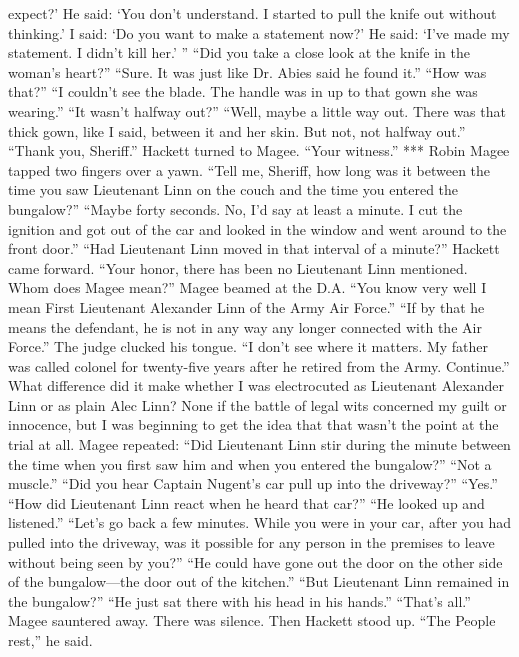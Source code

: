\documentclass{novel}
\begin{document}
expect?’ He said: ‘You don’t understand. I started to pull the knife out without thinking.’ I said: ‘Do you want to make a statement now?’ He said: ‘I’ve made my statement. I didn’t kill her.’ ” “Did you take a close look at the knife in the woman’s heart?” “Sure. It was just like Dr. Abies said he found it.” “How was that?” “I couldn’t see the blade. The handle was in up to that gown she was wearing.” “It wasn’t halfway out?” “Well, maybe a little way out. There was that thick gown, like I said, between it and her skin. But not, not halfway out.” “Thank you, Sheriff.” Hackett turned to Magee. “Your witness.” *** Robin Magee tapped two fingers over a yawn. “Tell me, Sheriff, how long was it between the time you saw Lieutenant Linn on the couch and the time you entered the bungalow?” “Maybe forty seconds. No, I’d say at least a minute. I cut the ignition and got out of the car and looked in the window and went around to the front door.” “Had Lieutenant Linn moved in that interval of a minute?” Hackett came forward. “Your honor, there has been no Lieutenant Linn mentioned. Whom does Magee mean?” Magee beamed at the D.A. “You know very well I mean First Lieutenant Alexander Linn of the Army Air Force.” “If by that he means the defendant, he is not in any way any longer connected with the Air Force.” The judge clucked his tongue. “I don’t see where it matters. My father was called colonel for twenty-five years after he retired from the Army. Continue.” What difference did it make whether I was electrocuted as Lieutenant Alexander Linn or as plain Alec Linn? None if the battle of legal wits concerned my guilt or innocence, but I was beginning to get the idea that that wasn’t the point at the trial at all. Magee repeated: “Did Lieutenant Linn stir during the minute between the time when you first saw him and when you entered the bungalow?” “Not a muscle.” “Did you hear Captain Nugent’s car pull up into the driveway?” “Yes.” “How did Lieutenant Linn react when he heard that car?” “He looked up and listened.” “Let’s go back a few minutes. While you were in your car, after you had pulled into the driveway, was it possible for any person in the premises to leave without being seen by you?” “He could have gone out the door on the other side of the bungalow—the door out of the kitchen.” “But Lieutenant Linn remained in the bungalow?” “He just sat there with his head in his hands.” “That’s all.” Magee sauntered away. There was silence. Then Hackett stood up. “The People rest,” he said.


\begin{ChapterStart}

\vspace{3\nbs}
\end{ChapterStart}
\end{document}
